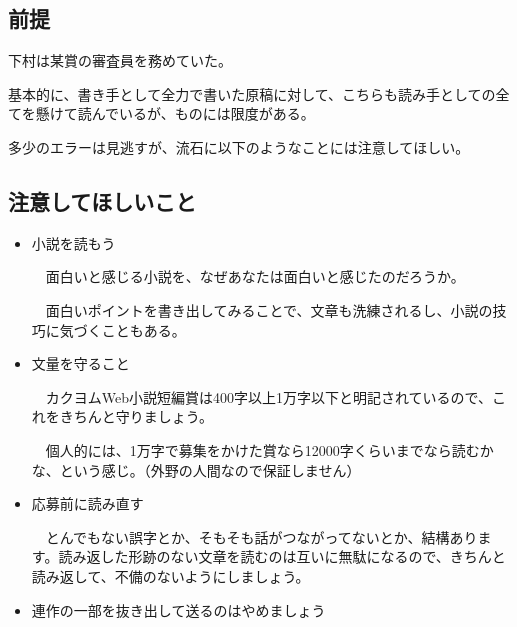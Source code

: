 \documentclass[10pt, a5paper, twoside]{jsarticle}
\theoremstyle{definition}
\begin{document}
		\subsection{前提}

			下村は某賞の審査員を務めていた。

			基本的に、書き手として全力で書いた原稿に対して、こちらも読み手としての全てを懸けて読んでいるが、ものには限度がある。

			多少のエラーは見逃すが、流石に以下のようなことには注意してほしい。

		\subsection{注意してほしいこと}

			\begin{itemize}

				\item 小説を読もう

				\vspace{1mm}

				　面白いと感じる小説を、なぜあなたは面白いと感じたのだろうか。

				　面白いポイントを書き出してみることで、文章も洗練されるし、小説の技巧に気づくこともある。

				\vspace{2mm}

				\item 文量を守ること

				\vspace{1mm}

				　カクヨムWeb小説短編賞は400字以上1万字以下と明記されているので、これをきちんと守りましょう。

				　個人的には、1万字で募集をかけた賞なら12000字くらいまでなら読むかな、という感じ。（外野の人間なので保証しません）

				\vspace{2mm}

				\item 応募前に読み直す

				\vspace{1mm}

				　とんでもない誤字とか、そもそも話がつながってないとか、結構あります。読み返した形跡のない文章を読むのは互いに無駄になるので、きちんと読み返して、不備のないようにしましょう。

				\vspace{2mm}

				\item 連作の一部を抜き出して送るのはやめましょう


\end{itemize}
\end{document}
